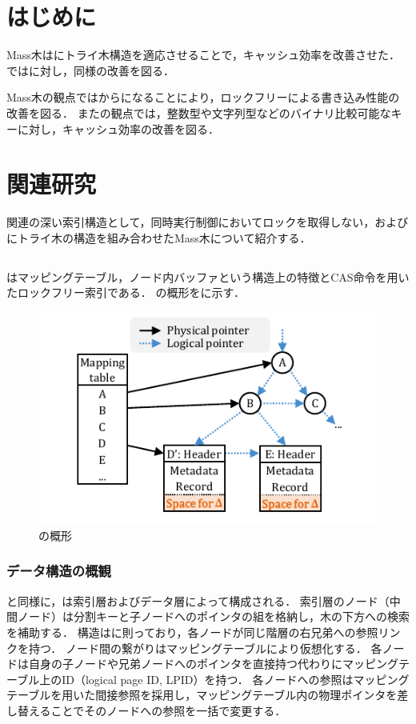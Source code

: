 
\section{はじめに}

Mass木は\Bptree{}にトライ木構造を適応させることで，キャッシュ効率を改善させた．
\Bcforest{}では\Bctree{}に対し，同様の改善を図る．

Mass木の観点では\Bptree{}から\Bctree{}になることにより，ロックフリーによる書き込み性能の改善を図る．
また\Bctree{}の観点では，整数型や文字列型などのバイナリ比較可能なキーに対し，キャッシュ効率の改善を図る．

\section{関連研究}
\label{sec:relatedwork}
関連の深い索引構造として，同時実行制御においてロックを取得しない\Bctree{}，および\Bptree{}にトライ木の構造を組み合わせたMass木について紹介する．

\subsection{\Bctree{}}
\Bctree{}はマッピングテーブル，ノード内バッファという構造上の特徴とCAS命令を用いたロックフリー索引である．
\Bctree{}の概形を\Fig{\ref{fig:bc_tree-structure}}に示す．

\begin{figure}[t]
    \centering
    \includegraphics{./figures/Bc-structure.pdf}
    \caption{\Bctree{}の概形}
    \label{fig:bc_tree-structure}
\end{figure}

\subsubsection{データ構造の概観}
\Bptree{}と同様に，\Bctree{}は索引層およびデータ層によって構成される．
索引層のノード（中間ノード）は分割キーと子ノードへのポインタの組を格納し，木の下方への検索を補助する．
構造は\Blinktree{}に則っており，各ノードが同じ階層の右兄弟への参照リンクを持つ．
ノード間の繋がりはマッピングテーブルにより仮想化する．
各ノードは自身の子ノードや兄弟ノードへのポインタを直接持つ代わりにマッピングテーブル上のID（logical page ID, LPID）を持つ．
各ノードへの参照はマッピングテーブルを用いた間接参照を採用し，マッピングテーブル内の物理ポインタを差し替えることでそのノードへの参照を一括で変更する．

